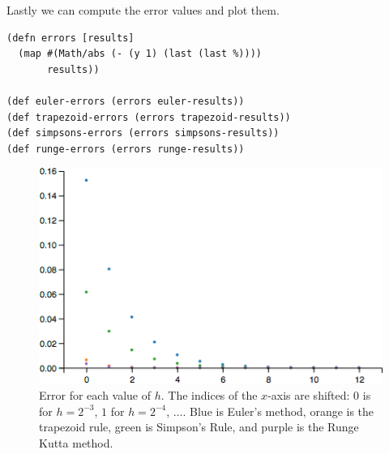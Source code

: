 {\begin{enumerate}[leftmargin=0pt]
\end{enumerate}

Lastly we can compute the error values and plot them.

\begin{verbatim}
(defn errors [results]
  (map #(Math/abs (- (y 1) (last (last %))))
       results))

(def euler-errors (errors euler-results))
(def trapezoid-errors (errors trapezoid-results))
(def simpsons-errors (errors simpsons-results))
(def runge-errors (errors runge-results))
\end{verbatim}

\begin{figure}[H]
\centering
\includegraphics[scale=0.65]{numerical-comparison-errors.png}
\caption{Error for each value of $h$. The indices of the $x$-axis are
shifted: $0$ is for $h = 2^{-3}$, $1$ for $h = 2^{-4}$, $\dots$. Blue
is Euler's method, orange is the trapezoid rule, green is Simpson's
Rule, and purple is the Runge Kutta method.}
\end{figure}


}
